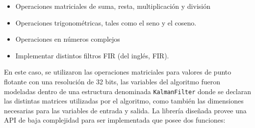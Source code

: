 \documentclass[10pt, a4paper]{report}
\begin{document}
\begin{itemize}
    \item Operaciones matriciales de suma, resta, multiplicaci\'on y divisi\'on
    \item Operaciones trigonom\'etricas, tales como el seno y el coseno.
    \item Operaciones en n\'umeros complejos
    \item Implementar distintos filtros \acrshort{FIR} (del ingl\'es,
        \acrlong{FIR}).
\end{itemize}

En este caso, se utilizaron las operaciones matriciales para valores de punto
flotante con una resoluci\'on de 32 bits, las variables del algoritmo fueron
modeladas dentro de una estructura denominada \texttt{KalmanFilter} donde se
declaran las distintas matrices utilizadas por el algoritmo, como tambi\'en las
dimensiones necesarias para las variables de entrada y salida. La librer\'ia 
diseñada provee una \acrshort{API} de baja complejidad para ser implementada que 
posee dos funciones:
\end{document}
